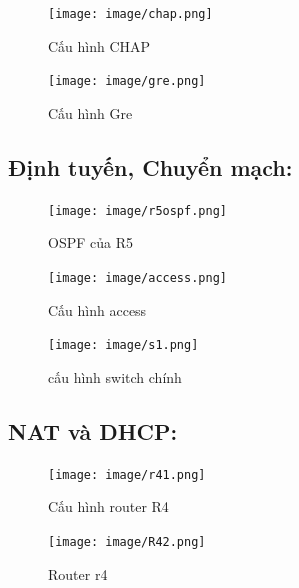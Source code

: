 \documentclass[13pt]{article}
\begin{document}
\begin{figure}[h!]
                \centering
                \texttt{[image: image/chap.png]}
                \caption{Cấu hình CHAP}
                \label{fig:label1}
            \end{figure}

\begin{figure}[h!]
                \centering
                \texttt{[image: image/gre.png]}
                \caption{Cấu hình Gre}
                \label{fig:label1}
            \end{figure}

   \subsection{Định tuyến, Chuyển mạch: }
\begin{figure}[h!]
                \centering
                \texttt{[image: image/r5ospf.png]}
                \caption{OSPF của R5}
                \label{fig:label1}
            \end{figure}

\begin{figure}[h!]
                \centering
                \texttt{[image: image/access.png]}
                \caption{Cấu hình access}
                \label{fig:label1}
            \end{figure}

\begin{figure}[h!]
                \centering
                \texttt{[image: image/s1.png]}
                \caption{cấu hình switch chính}
                \label{fig:label1}
            \end{figure}

  \subsection{NAT và DHCP:}


\begin{figure}[h!]
                \centering
                \texttt{[image: image/r41.png]}
                \caption{Cấu hình router R4}
                \label{fig:label1}
            \end{figure}

\begin{figure}[h!]
                \centering
                \texttt{[image: image/R42.png]}
                \caption{Router r4}
                \label{fig:label1}
            \end{figure}
\end{document}
